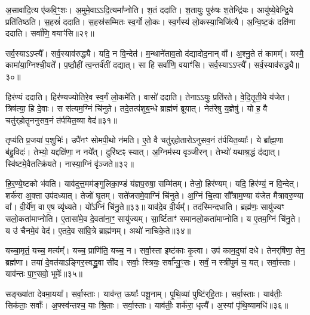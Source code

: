    अ॒सावा॑दि॒त्य ए॑कवि॒ꣳ॒शः।
   अ॒मुमे॒वाऽऽदि॒त्यमा᳚प्नोति।
   श॒तं ददा॑ति।
   श॒तायुः॒ पुरु॑षः श॒तेन्द्रि॑यः।
   आयु॑ष्ये॒वेन्द्रि॒ये प्रति॑तिष्ठति।
   स॒हस्रं॑ ददाति।
   स॒हस्र॑सम्मितः स्व॒र्गो लो॒कः।
   स्व॒र्गस्य॑ लो॒कस्या॒भिजि॑त्यै।
   अ॒न्वि॒ष्ट॒कं दक्षि॑णा ददाति।
   सर्वा॑णि॒ वयाꣳ॑सि॥२९॥

   सर्व॒स्याऽऽप्त्यै᳚।
   सर्व॒स्याव॑रुद्ध्यै।
   यदि॒ न वि॒न्देत॑।
   म॒न्थाने॑ताव॒तो द॑द्यादोद॒नान् वा᳚᳚।
   अ॒श्नु॒ते तं कामम्᳚।
   यस्मै॒ कामा॑या॒ग्निश्ची॒यते᳚।
   प॒ष्ठौ॒हीं त्व॒न्तर्व॑तीं दद्यात्।
   सा हि सर्वा॑णि॒ वयाꣳ॑सि।
   सर्व॒स्याऽऽप्त्यै᳚।
   सर्व॒स्याव॑रुद्ध्यै॥३०॥

   हिर॑ण्यं ददाति।
   हिर॑ण्यज्योतिरे॒व स्व॒र्गं लो॒कमे॑ति।
   वासो॑ ददाति।
   तेनाऽऽयुः॒ प्रति॑रते।
   वे॒दि॒तृ॒ती॒ये य॑जेत।
   त्रिष॑त्या॒ हि दे॒वाः।
   स स॑त्यम॒ग्निं चि॑नुते।
   तदे॒तत्प॑शुब॒न्धे ब्राह्म॑णं ब्रूयात्।
   नेत॑रेषु य॒ज्ञेषु॑।
   यो ह॒ वै चतु॑र्‌होतॄननुसव॒नं त॑र्पयित॒व्या\sn{} वेद॑॥३१॥

   तृप्य॑ति प्र॒जया॑ प॒शुभिः॑।
   उपै॑नꣳ सोमपी॒थो न॑मति।
   ए॒ते वै चतु॑र्‌होतारोऽनुसव॒नं त॑र्पयित॒व्याः᳚।
   ये ब्रा᳚ह्म॒णा ब॑हु॒विदः॑।
   तेभ्यो॒ यद्दक्षि॑णा॒ न नये᳚त्।
   दुरि॑ष्टꣴ स्यात्।
   अ॒ग्निम॑स्य वृञ्जीरन्।
   तेभ्यो॑ यथाश्र॒द्धं द॑द्यात्।
   स्वि॑ष्टमे॒वैतत्क्रि॑यते।
   नास्या॒ग्निं वृ॑ञ्जते॥३२॥

   हि॒र॒ण्ये॒ष्टको भ॑वति।
   याव॑दुत्त॒मम॑ङ्गुलिका॒ण्डं य॑ज्ञप॒रुषा॒ सम्मि॑तम्।
   तेजो॒ हिर॑ण्यम्।
   यदि॒ हिर॑ण्यं॒ न वि॒न्देत्।
   शर्क॑रा अ॒क्ता उप॑दध्यात्।
   तेजो॑ घृ॒तम्।
   सते॑जसमे॒वाग्निं चि॑नुते।
   अ॒ग्निं चि॒त्वा सौ᳚त्राम॒ण्या य॑जेत मैत्रावरु॒ण्या वा᳚।
   वी॒र्ये॑ण॒ वा ए॒ष व्यृ॑ध्यते।
   यो᳚ऽग्निं चि॑नु॒ते॥३३॥
   याव॑दे॒व वी॒र्यम्᳚।
   तद॑स्मिन्दधाति।
   ब्रह्म॑णः॒ सायु॑ज्यꣳ सलो॒कता॑माप्नोति।
   ए॒तासा॑मे॒व दे॒वता॑ना॒ꣳ॒ सायु॑ज्यम्।
   सा॒र्ष्टिताꣳ॑ समानलो॒कता॑माप्नोति।
   य ए॒तम॒ग्निं चि॑नु॒ते।
   य उ॑ चैनमे॒वं वेद॑।
   ए॒तदे॒व सा॑वि॒त्रे ब्राह्म॑णम्।
   अथो॑ नाचिके॒ते॥३४॥
   \anuvakamend
  
   यच्चा॒मृतं॒ यच्च॒ मर्त्यम्᳚।
   यच्च॒ प्राणि॑ति॒ यच्च॒ न।
   सर्वा॒स्ता इष्ट॑काः कृ॒त्वा।
   उप॑ काम॒दुघा॑ दधे।
   तेनर्‌षि॑णा॒ तेन॒ ब्रह्म॑णा।
   तया॑ दे॒वत॑याऽङ्गिर॒स्वद्ध्रु॒वा सी॑द।
   सर्वाः॒ स्त्रियः॒ सर्वा᳚न्पु॒ꣳ॒सः।
   सर्वं॒ न स्त्री॑पुमं च॒ यत्।
   सर्वा॒स्ताः।
   याव॑न्तः पा॒ꣳ॒सवो॒ भूमेः᳚॥३५॥

   सङ्ख्या॑ता देवमा॒यया᳚।
   सर्वा॒स्ताः।
   याव॑न्त॒ ऊषाः᳚ पशू॒नाम्।
   पृ॒थि॒व्यां पुष्टि॑र्‌हि॒ताः।
   सर्वा॒स्ताः।
   याव॑तीः॒ सिक॑ताः॒ सर्वाः᳚।
   अ॒फ्स्व॑न्तश्च॒ याः श्रि॒ताः।
   सर्वा॒स्ताः।
   याव॑तीः॒ शर्क॑रा॒ धृत्यै᳚।
   अ॒स्यां पृ॑थि॒व्यामधि॑॥३६॥	

